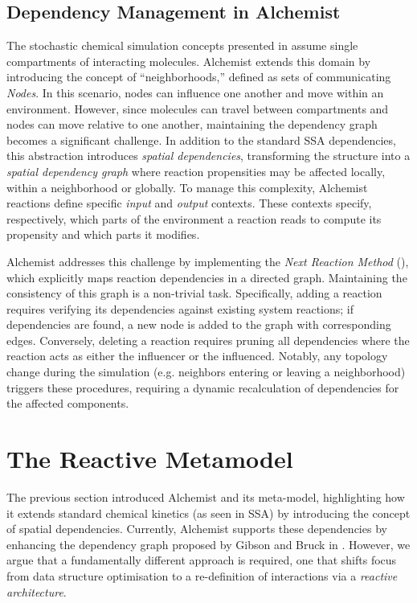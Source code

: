 \subsection{Dependency Management in Alchemist}
The stochastic chemical simulation concepts presented in
 assume single compartments of interacting
molecules. Alchemist extends this domain by introducing the concept of
``neighborhoods,'' defined as sets of communicating \emph{Nodes}. In this
scenario, nodes can influence one another and move within an environment.
However, since molecules can travel between compartments and nodes can move
relative to one another, maintaining the dependency graph becomes a significant
challenge. In addition to the standard \ac{SSA} dependencies, this abstraction
introduces \emph{spatial dependencies}, transforming the structure into a
\emph{spatial dependency graph} where reaction propensities may be affected
locally, within a neighborhood or globally. To manage this complexity,
Alchemist reactions define specific \emph{input} and \emph{output} contexts.
These contexts specify, respectively, which parts of the environment a reaction
reads to compute its propensity and which parts it modifies.

Alchemist addresses this challenge by implementing the \emph{Next Reaction
	Method} (), which explicitly maps reaction
dependencies in a directed graph. Maintaining the consistency of this graph is
a non-trivial task. Specifically, adding a reaction requires verifying its
dependencies against existing system reactions; if dependencies are found, a
new node is added to the graph with corresponding edges. Conversely, deleting a
reaction requires pruning all dependencies where the reaction acts as either
the influencer or the influenced. Notably, any topology change during the
simulation (e.g. neighbors entering or leaving a neighborhood) triggers these
procedures, requiring a dynamic recalculation of dependencies for the affected
components.

\section{The Reactive Metamodel}

The previous section introduced Alchemist and its meta-model, highlighting how
it extends standard chemical kinetics (as seen in \ac{SSA}) by introducing the
concept of spatial dependencies. Currently, Alchemist supports these
dependencies by enhancing the dependency graph proposed by Gibson and Bruck in
\cite{GibsonBruckEESSCSMSMC:2000}. However, we argue that a fundamentally
different approach is required, one that shifts focus from data structure
optimisation to a re-definition of interactions via a \emph{reactive
	architecture}.


